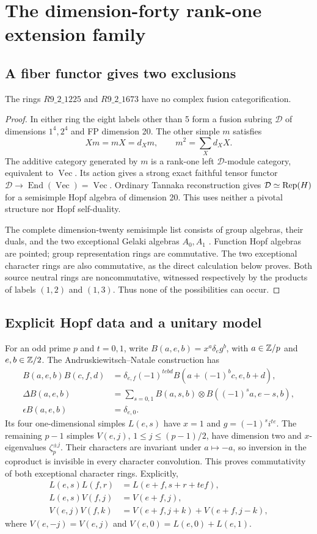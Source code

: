\documentclass[11pt,a4paper]{article}
\theoremstyle{remark}\newtheorem{remark}[theorem]{Remark}
\renewcommand{\Vec}{\operatorname{Vec}}\newcommand{\Irr}{\operatorname{Irr}}
\begin{document}
\section{The dimension-forty rank-one extension family}
\subsection{A fiber functor gives two exclusions}
\begin{proposition}
The rings $R9\_2\_1225$ and $R9\_2\_1673$ have no complex fusion
categorification.
\end{proposition}
\begin{proof}
In either ring the eight labels other than 5 form a fusion subring
$\mathcal D$ of dimensions $1^4,2^4$ and FP dimension 20. The other simple
$m$ satisfies
\[
 Xm=mX=d_Xm,\qquad m^2=\sum_Xd_XX.
\]
The additive category generated by $m$ is a rank-one left
$\mathcal D$-module category, equivalent to $\Vec$. Its action gives a
strong exact faithful tensor functor $\mathcal D\to\operatorname{End}(\Vec)
=\Vec$. Ordinary Tannaka reconstruction gives
$\mathcal D\simeq\operatorname{Rep}(H)$ for a semisimple Hopf algebra of dimension 20.
This uses neither a pivotal structure nor Hopf self-duality.

The complete dimension-twenty semisimple list consists of group algebras,
their duals, and the two exceptional Gelaki algebras $A_0,A_1$
\cite{ChengNg,Natale,AN}. Function Hopf algebras are pointed; group
representation rings are commutative. The two exceptional character rings
are also commutative, as the direct calculation below proves. Both source
neutral rings are noncommutative, witnessed respectively by the products
of labels $(1,2)$ and $(1,3)$. Thus none of the possibilities can occur.
\end{proof}

\subsection{Explicit Hopf data and a unitary model}
For an odd prime $p$ and $t=0,1$, write
$B(a,e,b)=x^a\delta_e g^b$, with $a\in\mathbb Z/p$ and $e,b\in\mathbb Z/2$.
The Andruskiewitsch--Natale construction \cite{AN} has
\begin{align*}
 B(a,e,b)B(c,f,d)&=\delta_{e,f}(-1)^{tebd}
 B(a+(-1)^bc,e,b+d),\\
 \Delta B(a,e,b)&=\sum_{s=0,1}B(a,s,b)\otimes B((-1)^sa,e-s,b),\\
 \epsilon B(a,e,b)&=\delta_{e,0}.
\end{align*}
Its four one-dimensional simples $L(e,s)$ have $x=1$ and
$g=(-1)^s i^{te}$. The remaining $p-1$ simples $V(e,j)$,
$1\leq j\leq(p-1)/2$, have dimension two and $x$-eigenvalues
$\zeta_p^{\pm j}$. Their characters are invariant under $a\mapsto-a$,
so inversion in the coproduct is invisible in every character convolution.
This proves commutativity of both exceptional character rings. Explicitly,
\begin{align*}
 L(e,s)L(f,r)&=L(e+f,s+r+tef),\\
 L(e,s)V(f,j)&=V(e+f,j),\\
 V(e,j)V(f,k)&=V(e+f,j+k)+V(e+f,j-k),
\end{align*}
where $V(e,-j)=V(e,j)$ and $V(e,0)=L(e,0)+L(e,1)$.
\end{document}
